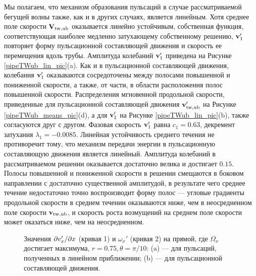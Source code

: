 Мы полагаем, что механизм образования пульсаций в случае рассматриваемой бегущей волны также, как и в других случаях, является линейным. Хотя среднее поле скорости $\mathbf{V}_\mathrm{tw,ub}$ оказывается линейно устойчивым, собственная функция, соответствующая наиболее медленно затухающему собственному решению, $\mathbf{v}'_1$ повторяет форму пульсационной составляющей движения и скорость ее перемещения вдоль трубы. Амплитуда колебаний $\mathbf{v}'_1$ приведена на Рисунке \ref{pipeTWub_lin_pic}(a). Как и в пульсационной составляющей движения, колебания $\mathbf{v}'_1$ оказываются сосредоточены между полосами повышенной и пониженной скорости, а также, от части, в области расположения полос повышенной скорости. Распределения мгновенной продольной скорости, приведенные для пульсационной составляющей движения $\mathbf{v}'_\mathrm{tw,ub}$ на Рисунке \ref{pipeTWub_means_pic}(d), а для $\mathbf{v}'_1$ на Рисунке \ref{pipeTWub_lin_pic}(b), также согласуются друг с другом. Фазовая скорость $\mathbf{v}'_1$ равна $c_1 = 0.63$, декремент затухания $\lambda_1 = -0.0085$. Линейная устойчивость среднего течения не противоречит тому, что механизм передачи энергии в пульсационную составляющую движения является линейный. Амплитуда колебаний в рассматриваемом решении оказывается достаточно велика и достигает $0.15$. Полосы повышенной и пониженной скорости в решении смещаются в боковом направлении с достаточно существенной амплитудой, в результате чего среднее течение недостаточно точно воспроизводит форму полос --- угловые градиенты продольной скорости в среднем течении оказываются ниже, чем в неосредненном поле скорости $\mathbf{v}_\mathrm{tw,ub}$, и скорость роста возмущений на среднем поле скорости может оказаться ниже, чем на неосредненном.

\begin{figure}
\caption{Значения $\partial v_x' /\partial x$ (кривая 1) и $\omega_x'$ (кривая 2) на прямой, где $\Omega_x$ достигает максимума, $r = 0.75, \theta = \pi/10$: (a) --- для пульсаций, полученных в линейном приближении; (b) --- для пульсационной составляющей движения. }
\label{pipeTWub_corr_pic}
\end{figure}

